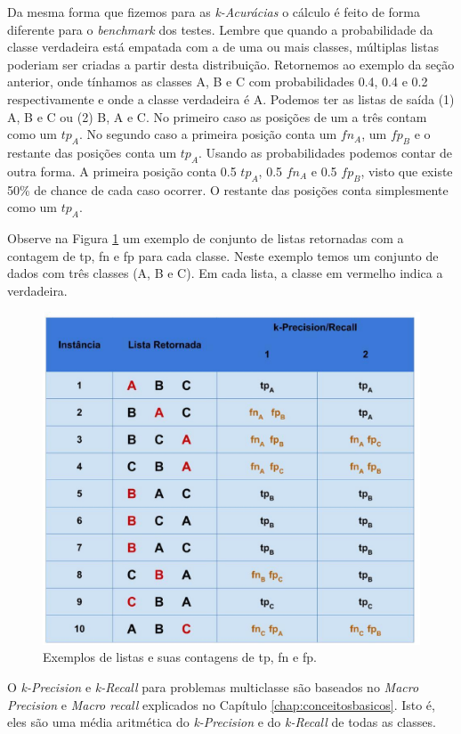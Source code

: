 Da mesma forma que fizemos para as \textit{k-Acurácias} o cálculo é feito de forma diferente para o \textit{benchmark} dos testes.
Lembre que quando a probabilidade da classe verdadeira está empatada com a de uma ou mais classes, múltiplas listas poderiam ser criadas a partir desta distribuição.
Retornemos ao exemplo da seção anterior, onde tínhamos as classes A, B e C com probabilidades 0.4, 0.4 e 0.2 respectivamente e onde a classe verdadeira é A.
Podemos ter as listas de saída (1) A, B e C ou (2) B, A e C.
No primeiro caso as posições de um a três contam como um $tp_A$.
No segundo caso a primeira posição conta um $fn_A$, um $fp_B$ e o restante das posições conta um $tp_A$.
Usando as probabilidades podemos contar de outra forma.
A primeira posição conta 0.5 $tp_A$, 0.5 $fn_A$ e 0.5 $fp_B$, visto que existe 50\% de chance de cada caso ocorrer.
O restante das posições conta simplesmente como um $tp_A$.

Observe na Figura \ref{fig:descricaodostestes03} um exemplo de conjunto de listas retornadas com a contagem de tp, fn e fp para cada classe.
Neste exemplo temos um conjunto de dados com três classes (A, B e C).
Em cada lista, a classe em vermelho indica a verdadeira.

\begin{figure}[h!]
  \centering
  \includegraphics[width=120mm,scale=0.8]{images/descricaodostestes03.eps}
  \caption{Exemplos de listas e suas contagens de tp, fn e fp.}
  \label{fig:descricaodostestes03}
\end{figure}

O \textit{k-Precision} e \textit{k-Recall} para problemas multiclasse são baseados no \textit{Macro Precision} e \textit{Macro recall} explicados no Capítulo \ref{chap:conceitosbasicos}.
Isto é, eles são uma média aritmética do \textit{k-Precision} e do \textit{k-Recall} de todas as classes. 

